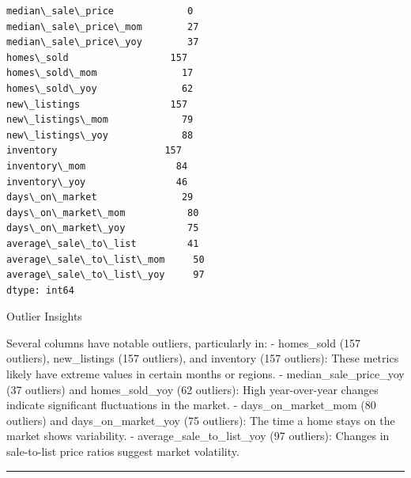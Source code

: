 \documentclass[11pt]{article}
\makeatletter
\newcommand{\boxspacing}{\kern\kvtcb@left@rule\kern\kvtcb@boxsep}
\newcommand{\prompt}[4]{
        {\ttfamily\llap{{\color{#2}[#3]:\hspace{3pt}#4}}\vspace{-\baselineskip}}
    }
\makeatother
\begin{document}
            \begin{tcolorbox}[breakable, size=fbox, boxrule=.5pt, pad at break*=1mm, opacityfill=0]
\prompt{Out}{outcolor}{15}{\boxspacing}
\begin{Verbatim}[commandchars=\\\{\}]
median\_sale\_price             0
median\_sale\_price\_mom        27
median\_sale\_price\_yoy        37
homes\_sold                  157
homes\_sold\_mom               17
homes\_sold\_yoy               62
new\_listings                157
new\_listings\_mom             79
new\_listings\_yoy             88
inventory                   157
inventory\_mom                84
inventory\_yoy                46
days\_on\_market               29
days\_on\_market\_mom           80
days\_on\_market\_yoy           75
average\_sale\_to\_list         41
average\_sale\_to\_list\_mom     50
average\_sale\_to\_list\_yoy     97
dtype: int64
\end{Verbatim}
\end{tcolorbox}
        
    Outlier Insights

Several columns have notable outliers, particularly in: - homes\_sold
(157 outliers), new\_listings (157 outliers), and inventory (157
outliers): These metrics likely have extreme values in certain months or
regions. - median\_sale\_price\_yoy (37 outliers) and homes\_sold\_yoy
(62 outliers): High year-over-year changes indicate significant
fluctuations in the market. - days\_on\_market\_mom (80 outliers) and
days\_on\_market\_yoy (75 outliers): The time a home stays on the market
shows variability. - average\_sale\_to\_list\_yoy (97 outliers): Changes
in sale-to-list price ratios suggest market volatility.

\begin{center}\rule{0.5\linewidth}{0.5pt}\end{center}
\end{document}
